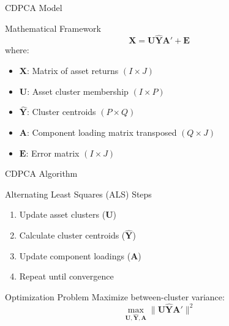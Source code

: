 \documentclass{beamer}
\begin{document}
\begin{frame}{CDPCA Model}
    \begin{block}{Mathematical Framework}
        \begin{equation*}
            \mathbf{X} = \mathbf{U}\hat{\mathbf{Y}}\mathbf{A}' + \mathbf{E}
        \end{equation*}
        where:
        \begin{itemize}
            \item $\mathbf{X}$: Matrix of asset returns $(I \times J)$
            \item $\mathbf{U}$: Asset cluster membership $(I \times P)$
            \item $\hat{\mathbf{Y}}$: Cluster centroids $(P \times Q)$
            \item $\mathbf{A}$: Component loading matrix transposed $(Q \times J)$
            \item $\mathbf{E}$: Error matrix $(I \times J)$
        \end{itemize}
    \end{block}
\end{frame}

\begin{frame}{CDPCA Algorithm}
    \begin{block}{Alternating Least Squares (ALS) Steps}
        \begin{enumerate}
            \item Update asset clusters ($\mathbf{U}$)
            \item Calculate cluster centroids ($\hat{\mathbf{Y}}$)
            \item Update component loadings ($\mathbf{A}$)
            \item Repeat until convergence
        \end{enumerate}
    \end{block}

    \begin{block}{Optimization Problem}
        Maximize between-cluster variance:
        \begin{equation*}
            \max_{\mathbf{U},\hat{\mathbf{Y}},\mathbf{A}} \|\mathbf{U}\hat{\mathbf{Y}}\mathbf{A}'\|^2
        \end{equation*}
    \end{block}
\end{frame}
\end{document}

